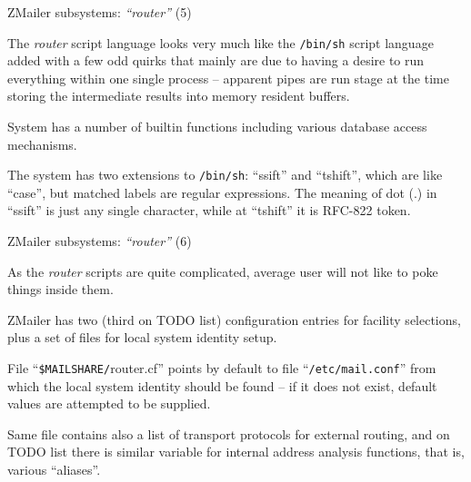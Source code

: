 \documentclass[a4paper,landscape]{slides}
\newcommand{\ZM}{ZMailer}
\begin{document}
\begin{slide}
\centerline{\large \ZM{} subsystems: {\em ``router''} (5)}

The {\em router} script language looks very much like the \verb!/bin/sh!
script language added with a few odd quirks that mainly are due to having
a desire to run everything within one single process -- apparent pipes
are run stage at the time storing the intermediate results into memory
resident buffers.

System has a number of builtin functions including various database
access mechanisms.

The system has two extensions to \verb!/bin/sh!: ``ssift'' and ``tshift'',
which are like ``case'', but matched labels are regular expressions.
The meaning of dot (.) in ``ssift'' is just any single character,
while at ``tshift'' it is RFC-822 token.

\vfill
\end{slide}

\begin{slide}
\centerline{\large \ZM{} subsystems: {\em ``router''} (6)}

As the {\em router} scripts are quite complicated, average user
will not like to poke things inside them.

\ZM{} has two (third on TODO list) configuration entries for facility
selections, plus a set of files for local system identity setup.

File ``\verb!$MAILSHARE/!router.cf'' points by default to file
``\verb!/etc/mail.conf!'' from which the local system identity
should be found -- if it does not exist, default values are
attempted to be supplied.

Same file contains also a list of transport protocols for external
routing, and on TODO list there is similar variable for internal
address analysis functions, that is, various ``aliases''.

\vfill
\end{slide}
\end{document}
